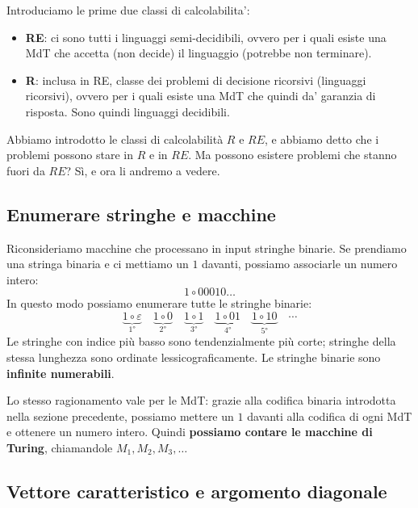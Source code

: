 
Introduciamo le prime due classi di calcolabilita':
\begin{itemize}
  \item \textbf{RE}: ci sono tutti i linguaggi semi-decidibili, ovvero per i quali esiste una MdT che accetta (non decide) il linguaggio (potrebbe non terminare).
\item \textbf{R}: inclusa in RE, classe dei problemi di decisione ricorsivi (linguaggi ricorsivi), ovvero per i quali esiste una MdT  che quindi da' garanzia di risposta. Sono quindi linguaggi decidibili.
\end{itemize}

Abbiamo introdotto le classi di calcolabilità $ R $ e $ RE $, e abbiamo detto che i problemi possono stare in $ R $ e in $ RE $. Ma possono esistere problemi che stanno fuori da $ RE $? Sì, e ora li andremo a vedere.

\subsection{Enumerare stringhe e macchine}

Riconsideriamo macchine che processano in input stringhe binarie. Se prendiamo una stringa binaria e ci mettiamo un $ 1 $ davanti, possiamo associarle un numero intero:
\[
  1 \circ 00010\ldots
\]
In questo modo possiamo enumerare tutte le stringhe binarie:
\[
  \underbrace{1 \circ \varepsilon}_{1°} \quad
  \underbrace{1 \circ 0}_{2°} \quad
  \underbrace{1 \circ 1}_{3°} \quad
  \underbrace{1 \circ 01}_{4°} \quad
  \underbrace{1 \circ 10}_{5°} \quad \cdots
\]
Le stringhe con indice più basso sono tendenzialmente più corte; stringhe della stessa lunghezza sono ordinate lessicograficamente. Le stringhe binarie sono \textbf{infinite numerabili}.

Lo stesso ragionamento vale per le MdT: grazie alla codifica binaria introdotta nella sezione precedente, possiamo mettere un $ 1 $ davanti alla codifica di ogni MdT e ottenere un numero intero. Quindi \textbf{possiamo contare le macchine di Turing}, chiamandole $ M_1, M_2, M_3, \ldots$

\subsection{Vettore caratteristico e argomento diagonale}


